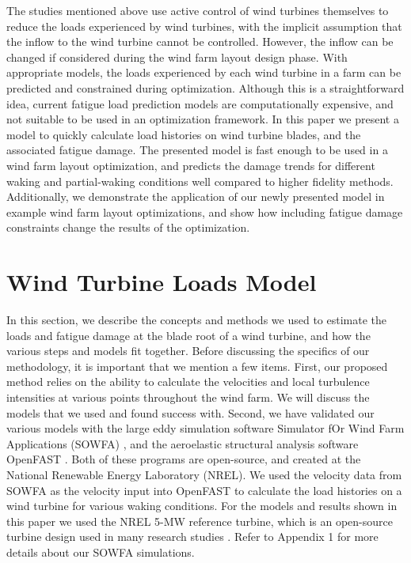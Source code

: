 \documentclass[11pt,letterpaper]{article}
\begin{document}
The studies mentioned above use active control of wind turbines themselves to reduce the loads experienced by wind turbines, with the implicit assumption that the inflow to the wind turbine cannot be controlled. 
However, the inflow can be changed if considered during the wind farm layout design phase.
With appropriate models, the loads experienced by each wind turbine in a farm can be predicted and constrained during optimization. 
Although this is a straightforward idea, current fatigue load prediction models are computationally expensive, and not suitable to be used in an optimization framework.
% 
In this paper we present a model to quickly calculate load histories on wind turbine blades, and the associated fatigue damage. The presented model is fast enough to be used in a wind farm layout optimization, and predicts the damage trends for different waking and partial-waking conditions well compared to higher fidelity methods. 
% 
Additionally, we demonstrate the application of our newly presented model in example wind farm layout optimizations, and show how including fatigue damage constraints change the results of the optimization.

% 
% 

\section{Wind Turbine Loads Model}
\label{sec1}
In this section, we describe the concepts and methods we used to estimate the loads and fatigue damage at the blade root of a wind turbine, and how the various steps and models fit together. 
% 
Before discussing the specifics of our methodology, it is important that we mention a few items. 
First, our proposed method relies on the ability to calculate the velocities and local turbulence intensities at various points throughout the wind farm. 
We will discuss the models that we used and found success with. 
Second, we have validated our various models with the large eddy simulation software Simulator fOr Wind Farm Applications (SOWFA) \cite{churchfield2012nwtc}, and the aeroelastic structural analysis software OpenFAST \cite{openfast_docs}. Both of these programs are open-source, and created at the National Renewable Energy Laboratory (NREL). We used the velocity data from SOWFA as the velocity input into OpenFAST to calculate the load histories on a wind turbine for various waking conditions. For the models and results shown in this paper we used the NREL 5-MW reference turbine, which is an open-source turbine design used in many research studies \cite{jonkman2009definition}.
Refer to Appendix 1 for more details about our SOWFA simulations.
\end{document}

